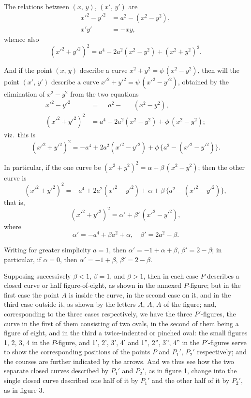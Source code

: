 \documentclass[11pt,a4paper]{book}
\begin{document}
The relations between $(x,\,y)$, $(x',\,y')$ are
\begin{align*}
x'^2 - y'^2 &= a^2 - (x^2 - y^2), \\
x'y' &= -xy,
\end{align*}
whence also
\[
(x'^2 + y'^2)^2 = a^4 - 2a^2(x^2-y^2) + (x^2+y^2)^2.
\]

And if the point $(x,\,y)$ describe a curve $x^2+y^2 = \phi\,(x^2-y^2)$, then will the point $(x',\,y')$ describe a curve $x'^2+y'^2 = \psi\,(x'^2-y'^2)$, obtained by the elimination of $x^2-y^2$ from the two equations
\begin{align*}
x'^2 - y'^2 &= \phantom{-}a^2 - \phantom{2a^2\,}(x^2-y^2), \\
(x'^2+y'^2)^2 &= a^4 - 2a^2(x^2-y^2) + \phi\,(x^2-y^2);
\end{align*}
viz.\ this is
\[
(x'^2+y'^2)^2 = -a^4 + 2a^2(x'^2-y'^2) + \phi\,\{a^2 - (x'^2-y'^2)\}.
\]

In particular, if the one curve be $(x^2+y^2)^2 = \alpha + \beta\,(x^2-y^2)$; then the other curve is
\[
(x'^2+y'^2)^2 = -a^4 + 2a^2(x'^2-y'^2) + \alpha + \beta\,\{a^2 - (x'^2-y'^2)\},
\]
that is,
\[
(x'^2+y'^2)^2 = \alpha' + \beta'\,(x'^2-y'^2),
\]
where
\[
\alpha' = -a^4 + \beta a^2 + \alpha, \quad \beta' = 2a^2 - \beta.
\]

Writing for greater simplicity $a=1$, then $\alpha' = -1 + \alpha + \beta$, $\beta' = 2 - \beta$; in particular, if $\alpha = 0$, then $\alpha' = -1 + \beta$, $\beta' = 2 - \beta$.

Supposing successively $\beta < 1$, $\beta = 1$, and $\beta > 1$, then in each case $P$ describes a closed curve or half figure-of-eight, as shown in the annexed $P$-figure; but in the first case the point $A$ is inside the curve, in the second case on it, and in the third case outside it, as shown by the letters $A$, $A$, $A$ of the figure; and, corresponding to the three cases respectively, we have the three $P'$-figures, the curve in the first of them consisting of two ovals, in the second of them being a figure of eight, and in the third a twice-indented or pinched oval: the small figures 1, 2, 3, 4 in the $P$-figure, and 1', 2', 3', 4' and 1'', 2'', 3'', 4'' in the $P'$-figures serve to show the corresponding positions of the points $P$ and $P_1'$, $P_2'$ respectively; and the courses are further indicated by the arrows. And we thus see how the two separate closed curves described by $P_1'$ and $P_2'$, as in figure 1, change into the single closed curve described one half of it by $P_1'$ and the other half of it by $P_2'$, as in figure 3.
\end{document}
